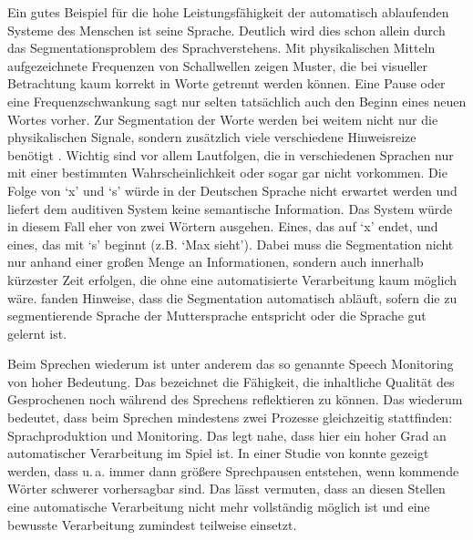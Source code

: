 \documentclass[doc,a4paper,12pt]{apa6}
\begin{document}
Ein gutes Beispiel für die hohe Leistungsfähigkeit der automatisch ablaufenden Systeme des Menschen ist seine Sprache. Deutlich wird dies schon allein durch das Segmentationsproblem des Sprachverstehens. Mit physikalischen Mitteln aufgezeichnete Frequenzen von Schallwellen zeigen Muster, die bei visueller Betrachtung kaum korrekt in Worte getrennt werden können. Eine Pause oder eine Frequenzschwankung sagt nur selten tatsächlich auch den Beginn eines neuen Wortes vorher. Zur Segmentation der Worte werden bei weitem nicht nur die physikalischen Signale, sondern zusätzlich viele verschiedene Hinweisreize benötigt \parencites[u.\,a.][]{brent1996distributional}{saffran1996word}. Wichtig sind vor allem Lautfolgen, die in verschiedenen Sprachen nur mit einer bestimmten Wahrscheinlichkeit oder sogar gar nicht vorkommen. Die Folge von `x' und `s' würde in der Deutschen Sprache nicht erwartet werden und liefert dem auditiven System keine semantische Information. Das System würde in diesem Fall eher von zwei Wörtern ausgehen. Eines, das auf `x' endet, und eines, das mit `s' beginnt (z.B. `Max sieht'). Dabei muss die Segmentation nicht nur anhand einer großen Menge an Informationen, sondern auch innerhalb kürzester Zeit erfolgen, die ohne eine automatisierte Verarbeitung kaum möglich wäre. \textcite{sanders2002segmenting} fanden Hinweise, dass die Segmentation automatisch abläuft, sofern die zu segmentierende Sprache der Muttersprache entspricht oder die Sprache gut gelernt ist.

Beim Sprechen wiederum ist unter anderem das so genannte Speech Monitoring \parencites{levelt1983monitoring}{postma2000detection} von hoher Bedeutung. Das bezeichnet die Fähigkeit, die inhaltliche Qualität des Gesprochenen noch während des Sprechens reflektieren zu können. Das wiederum bedeutet, dass beim Sprechen mindestens zwei Prozesse gleichzeitig stattfinden: Sprachproduktion und Monitoring. Das legt nahe, dass hier ein hoher Grad an automatischer Verarbeitung im Spiel ist. In einer Studie von \textcite{goldman1958speech} konnte gezeigt werden, dass u.\,a. immer dann größere Sprechpausen entstehen, wenn kommende Wörter schwerer vorhersagbar sind. Das lässt vermuten, dass an diesen Stellen eine automatische Verarbeitung nicht mehr vollständig möglich ist und eine bewusste Verarbeitung zumindest teilweise einsetzt.
\end{document}

